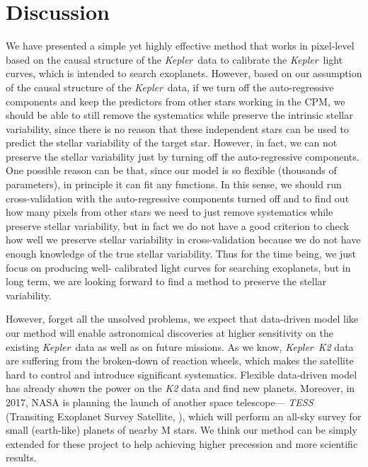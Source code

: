 \documentclass[12pt, preprint]{aastex}
\newcommand{\project}[1]{\textsl{#1}}
\newcommand{\Kepler}{\project{Kepler}}
\newcommand{\name}{CPM}
\begin{document}
\section{Discussion}
We have presented a simple yet highly effective method that works in pixel-level 
based on the causal structure of the \Kepler\ data to calibrate the \Kepler\ light curves, 
which is intended to search exoplanets. 
However, based on our assumption of the causal structure of the \Kepler\ 
data, if we turn off the auto-regressive components and keep the predictors from other
stars working  in the \name, we should be able to still remove the systematics while
preserve the intrinsic stellar  variability, since there is no reason that these independent
stars can be used to predict the stellar variability of the target star. However, in fact, we
can not preserve the stellar variability just by turning off the auto-regressive 
components. One possible reason can be that, since our model is so flexible 
(thousands of parameters), in principle it can fit any functions. In this sense, we should 
run cross-validation with the auto-regressive components turned off and to find out how
many pixels from other stars we need to just remove systematics while preserve stellar
variability, but in fact we do not have a good criterion to check how well we preserve
stellar variability in cross-validation because we do not have enough knowledge of the 
true stellar variability. Thus for the time being, we just focus on producing well-
calibrated light curves for searching exoplanets, but in long term, we are looking
forward to find a method to preserve the stellar variability.

However, forget all the unsolved problems, 
  we expect that data-driven model like our method will enable astronomical discoveries 
  at higher sensitivity on the existing \Kepler\ data as well as on future missions.  
As we know, \Kepler\ \project{K2} \citep{k2} data are suffering from the broken-down of reaction wheels, 
  which makes the satellite hard to control and introduce significant systematics. 
Flexible data-driven model \citep{dfm} has already shown the power on the \project{K2} data 
  and find new planets.
Moreover, in 2017, NASA is planning the launch of another space telescope---
  \project{TESS} (Transiting Exoplanet Survey Satellite, \cite{tess}), 
  which will perform an all-sky survey for small (earth-like) planets of nearby M stars. 
  We think our method can be simply extended for these project to help achieving higher precession and more scientific results. 
\end{document}
